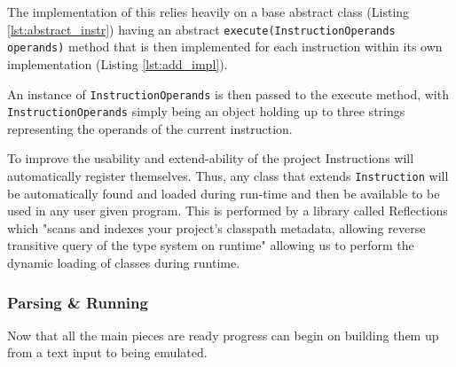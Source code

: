 \documentclass[a4paper,fleqn,twoside,12pt]{article}
\begin{document}
The implementation of this relies heavily on a base abstract class (Listing \ref{lst:abstract_instr}) having an abstract \texttt{execute(InstructionOperands operands)} method that is then implemented for each instruction within its own implementation (Listing \ref{lst:add_impl}). 

An instance of \texttt{InstructionOperands} is then passed to the execute method, with \texttt{InstructionOperands} simply being an object holding up to three strings representing the operands of the current instruction.

To improve the usability and extend-ability of the project Instructions will automatically register themselves. Thus, any class that extends \texttt{Instruction} will be automatically found and loaded during run-time and then be available to be used in any user given program. This is performed by a library called Reflections \cite{ronmamo_2022_ronmamoreflections} which "scans and indexes your project's classpath metadata, allowing reverse transitive query of the type system on runtime" allowing us to perform the dynamic loading of classes during runtime. 
\\




   

    




\subsubsection{Parsing \& Running}
Now that all the main pieces are ready progress can begin on building them up from a text input to being emulated.
\end{document}
